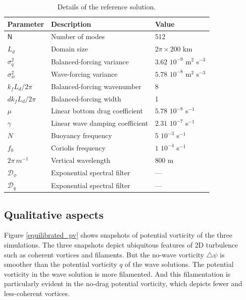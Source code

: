 \documentclass[12pt]{article}
\newcommand{\lap}{\triangle}
\newcommand{\?}{\stackrel{?}{=}}
\newcommand{\D}{\mathcal{D}}
\begin{document}
\begin{table}
 \begin{center}
   \caption{Details of the reference solution.}
   \label{parameters_reference}
   \begin{tabular}{ l | l | l }
     \hline
      Parameter & Description & Value \\
      \hline
      $\mathsf{N}$   & Number of modes &  512  \\
      $L_d$ & Domain size & $2\pi\times 200$ km \\
      $\sigma_q^2$ & Balanced-forcing variance & $3.62\,\,10^{-9}$ m$^2$ s$^{-3}$ \\
      $\sigma_w^2$ & Wave-forcing variance & $5.78\,\,10^{-8}$ m$^2$ s$^{-3}$ \\
      $k_f L_d/2\pi$    & Balanced-forcing wavenumber & 8 \\
      ${dk}_f L_d/2\pi$    & Balanced-forcing width &  1 \\
      $\mu$ & Linear bottom drag coefficient & $5.78\,\,10^{-8}$ s$^{-1}$ \\
      $\gamma$ & Linear wave damping coefficient & $2.31\,\,10^{-7}$ s$^{-1}$ \\
      $N$ & Buoyancy frequency &  $5\,\,10^{-3}$ s$^{-1}$\\
      $f_0$ & Coriolis frequency &  $1\,\,10^{-4}$ s$^{-1}$\\
      $2\pi\,m^{-1}$ & Vertical wavelength &  $800$ m\\
      $\D_\phi$ & Exponential spectral filter & ---\\
      $\D_q$ & Exponential spectral filter & ---\\
   \end{tabular}
 \end{center}
\end{table}

\subsection{Qualitative aspects}
Figure \ref{equilibrated_pv} shows snapshots of potential vorticity of the three simulations.
The three snapshots depict ubiquitous features of 2D turbulence such as coherent vortices
and filaments. But the no-wave vorticity $\lap\psi$ is smoother than the potential
vorticity $q$ of the wave solutions. The potential vorticity in the wave solution is
more filamented. And this filamentation is particularly evident in the no-drag potential
vorticity, which depicts fewer and less-coherent vortices.
\end{document}

